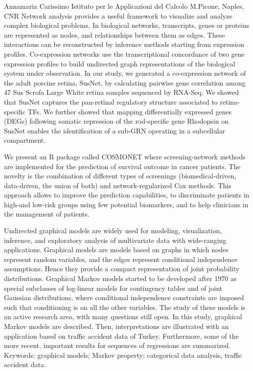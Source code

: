 {Annamaria Carissimo} {Istituto per le Applicazioni del Calcolo M.Picone, Naples, CNR}
Network analysis provides a useful framework to visualize and analyze complex biological problems. In biological networks, transcripts, genes or proteins are represented as nodes, and relationships between them as edges. These interactions can be reconstructed by inference methods starting from expression profiles. Co-expression networks use the transcriptional concordance of two gene expression profiles to build undirected graph representations of the biological system under observation. In our study, we generated a co-expression network of the adult porcine retina, SusNet,  by calculating pairwise gene correlation among 47 Sus Scrofa Large White retina samples sequenced by RNA-Seq.  We showed that SusNet captures the pan-retinal regulatory structure associated to retina-specific TFs. We further showed that mapping differentially expressed genes (DEGs) following somatic repression of the rod-specific gene Rhodopsin on SusNet enables the identification of a sub-GRN operating in a subcellular compartment.


We present an R package called COSMONET where screening-network methods are implemented for the prediction of survival outcome in cancer patients. The novelty is the combination of different types of screenings (biomedical-driven, data-driven, the union of both) and network-regularized Cox methods. This approach allows to improve the prediction capabilities, to discriminate patients in high-and low-risk groups using few potential biomarkers, and to help clinicians in the management of patients.

Undirected graphical models are widely used for modeling, visualization, inference, and exploratory analysis of multivariate data with wide-ranging applications. Graphical models are models based on graphs in which nodes represent random variables, and the edges represent conditional independence assumptions. Hence they provide a compact representation of joint probability distributions. Graphical Markov models started to be developed after 1970 as special subclasses of log-linear models for contingency tables and of joint Gaussian distributions, where conditional independence constraints are imposed such that conditioning is on all the other variables. The study of these models is an active research area, with many questions still open. In this study, graphical Markov models are described. Then, interpretations are illustrated with an application based on traffic accident data of Turkey. Furthermore, some of the more recent, important results for sequences of regressions are summarized.
Keywords: graphical models; Markov property; categorical data analysis, traffic accident data.


